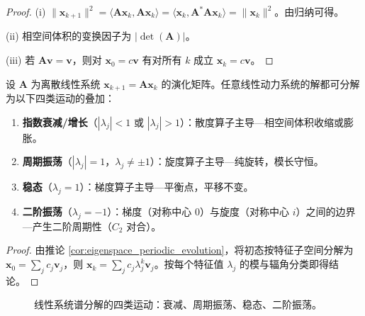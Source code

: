 \begin{proof}
(i) $\|\mathbf{x}_{k+1}\|^2 = \langle \mathbf{A}\mathbf{x}_k, \mathbf{A}\mathbf{x}_k \rangle = \langle \mathbf{x}_k, \mathbf{A}^*\mathbf{A}\mathbf{x}_k \rangle = \|\mathbf{x}_k\|^2$。由归纳可得。

(ii) 相空间体积的变换因子为 $|\det(\mathbf{A})|$。

(iii) 若 $\mathbf{A}\mathbf{v} = \mathbf{v}$，则对 $\mathbf{x}_0 = c\mathbf{v}$ 有对所有 $k$ 成立 $\mathbf{x}_k = c\mathbf{v}$。
\end{proof}

\begin{corollary}[线性系统的谱分析与周期分解]\label{cor:linear_system_spectral_period}
设 $\mathbf{A}$ 为离散线性系统 $\mathbf{x}_{k+1} = \mathbf{A}\mathbf{x}_k$ 的演化矩阵。任意线性动力系统的解都可分解为以下四类运动的叠加：
\begin{enumerate}[label=(\roman*)]
    \item \textbf{指数衰减/增长}（$|\lambda_j| < 1$ 或 $|\lambda_j| > 1$）：散度算子主导---相空间体积收缩或膨胀。
    \item \textbf{周期振荡}（$|\lambda_j| = 1$，$\lambda_j \neq \pm 1$）：旋度算子主导---纯旋转，模长守恒。
    \item \textbf{稳态}（$\lambda_j = 1$）：梯度算子主导---平衡点，平移不变。
    \item \textbf{二阶振荡}（$\lambda_j = -1$）：梯度（对称中心 $0$）与旋度（对称中心 $i$）之间的边界---产生二阶周期性（$C_2$ 对合）。
\end{enumerate}
\end{corollary}

\begin{proof}
由推论 \ref{cor:eigenspace_periodic_evolution}，将初态按特征子空间分解为 $\mathbf{x}_0 = \sum_j c_j \mathbf{v}_j$，则 $\mathbf{x}_k = \sum_j c_j \lambda_j^k \mathbf{v}_j$。按每个特征值 $\lambda_j$ 的模与辐角分类即得结论。
\end{proof}

\begin{figure}[htbp]
\centering
{}
\caption{线性系统谱分解的四类运动：衰减、周期振荡、稳态、二阶振荡。}
\label{fig:linear_system_spectral}
\end{figure}

